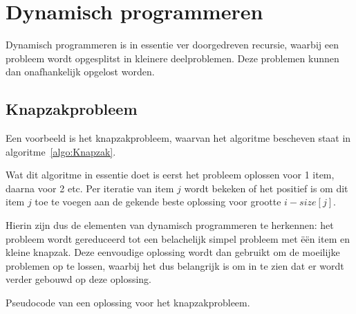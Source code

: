 \chapter{Dynamisch programmeren}
Dynamisch programmeren is in essentie ver doorgedreven recursie, waarbij een probleem wordt opgesplitst in kleinere deelproblemen.
Deze problemen kunnen dan onafhankelijk opgelost worden.

\section{Knapzakprobleem}
Een voorbeeld is het knapzakprobleem, waarvan het algoritme bescheven staat in algoritme~\ref{algo:Knapzak}.

Wat dit algoritme in essentie doet is eerst het probleem oplossen voor 1 item, daarna voor 2 etc. 
Per iteratie van item $j$ wordt bekeken of het positief is om dit item $j$ toe te voegen aan de gekende beste oplossing voor grootte $i - size[j]$.

Hierin zijn dus de elementen van dynamisch programmeren te herkennen: het probleem wordt gereduceerd tot een belachelijk simpel probleem met \"e\"en item en kleine knapzak.
Deze eenvoudige oplossing wordt dan gebruikt om de moeilijke problemen op te lossen, waarbij het dus belangrijk is om in te zien dat er wordt verder gebouwd op deze oplossing.

\begin{algorithm}
    \caption{Pseudocode van een oplossing voor het knapzakprobleem.}
    \label{algo:Knapzak}
    \begin{algorithmic}
         
             
                    \EndIf
                \EndIf
            \EndFor    
        \EndFor
    \end{algorithmic}
\end{algorithm}

